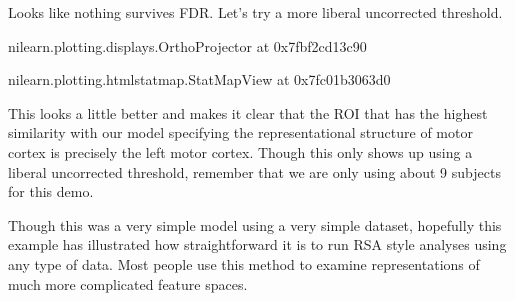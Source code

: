 \documentclass[letterpaper,10pt,english]{sphinxmanual}
\begin{document}
\noindent{}

Looks like nothing survives FDR. Let’s try a more liberal uncorrected threshold.

\begin{sphinxVerbatim}[commandchars=\\\{\}]
    

 
\end{sphinxVerbatim}

\begin{sphinxVerbatim}[commandchars=\\\{\}]
\PYGZlt{}nilearn.plotting.displays.OrthoProjector at 0x7fbf2cd13c90\PYGZgt{}
\end{sphinxVerbatim}

\noindent{}

\begin{sphinxVerbatim}[commandchars=\\\{\}]
\end{sphinxVerbatim}

\begin{sphinxVerbatim}[commandchars=\\\{\}]
\PYGZlt{}nilearn.plotting.html\PYGZus{}stat\PYGZus{}map.StatMapView at 0x7fc01b3063d0\PYGZgt{}
\end{sphinxVerbatim}

This looks a little better and makes it clear that the ROI that has the highest similarity with our model specifying the representational structure of motor cortex is precisely the left motor cortex. Though this only shows up using a liberal uncorrected threshold, remember that we are only using about 9 subjects for this demo.

Though this was a very simple model using a very simple dataset, hopefully this example has illustrated how straightforward it is to run RSA style analyses using any type of data. Most people use this method to examine representations of much more complicated feature spaces.
\end{document}

